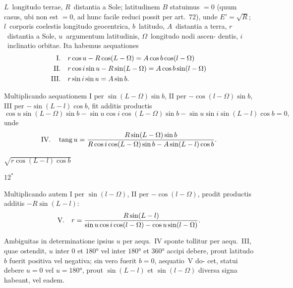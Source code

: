 \documentclass[12pt,a4paper]{article}
\newcommand{\tang}{\mathop{\mathrm{tang}}\nolimits}
\begin{document}
$L$~longitudo terrae, $R$~distantia a Sole; latitudinem $B$ statuimus $= 0$
(quum casus, ubi non est $= 0$, ad hunc facile reduci possit per art.~72), unde
$E' = \surd R$; $l$~corporis coelestis longitudo geocentrica, $b$~latitudo, $A$~distantia a
terra, $r$~distantia a Sole, $u$~argumentum latitudinis, $\Omega$~longitudo nodi ascen-
dentis, $i$~inclinatio orbitae. Ita habemus aequationes
\begin{align*}
\text{I.\quad} & r\cos u - R\cos(L - \Omega) = A\cos b\cos(l - \Omega) \\
\text{II.\quad} & r\cos i\sin u - R\sin(L - \Omega) = A\cos b\sin(l - \Omega) \\
\text{III.\quad} & r\sin i\sin u = A\sin b.
\end{align*}

Multiplicando aequationem I per $\sin(L - \Omega)\sin b$, II per $-\cos(l - \Omega)\sin b$,
III per $-\sin(L - l)\cos b$, fit additis productis
\[
\cos u\sin(L - \Omega)\sin b - \sin u\cos i\cos(L - \Omega)\sin b - \sin u\sin i\sin(L - l)\cos b = 0,
\]
unde
\begin{equation*}
\text{IV.\quad} \tang u = \frac{R\sin(L - \Omega)\sin b}{R\cos i\cos(L - \Omega)\sin b - A\sin(L - l)\cos b}.
\end{equation*}
\begin{center}
$\sqrt{r\cos(L - l)\cos b}$
\end{center}
\vspace{-0.5em}
\begin{flushright}
$12^*$
\end{flushright}

Multiplicando autem I per $\sin(l - \Omega)$, II per $-\cos(l - \Omega)$, prodit productis
additis $-R\sin(L - l)$:
\begin{equation*}
\text{V.\quad} r = \frac{R\sin(L - l)}{\sin u\cos i\cos(l - \Omega) - \cos u\sin(l - \Omega)}.
\end{equation*}

Ambiguitas in determinatione ipsius $u$ per aequ.~IV sponte tollitur per aequ.~III,
quae ostendit, $u$ inter $0$ et $180°$ vel inter $180°$ et $360°$ accipi debere, prout
latitudo $b$ fuerit positiva vel negativa; sin vero fuerit $b = 0$, aequatio~V do-
cet, statui debere $u = 0$ vel $u = 180°$, prout $\sin(L - l)$ et $\sin(l - \Omega)$ diversa
signa habeant, vel eadem.
\end{document}
